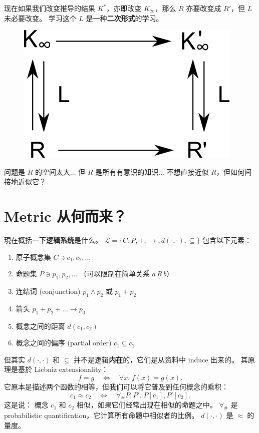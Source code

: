 \documentclass[12pt]{article}
\begin{document}
现在如果我们改变推导的结果 $K^*$，亦即改变 $K_\infty$，那么 $R$ 亦要改变成 $R'$，但 $L$ 未必要改变。  学习这个 $L$ 是一种\textbf{二次形式}的学习。
\begin{figure}[H]
\centering
\includegraphics[scale=0.6]{2nd-order-maps-3.png}
\end{figure}

问题是 $R$ 的空间太大... 但 $R$ 是所有有意识的知识... 不想直接近似 $R$，但如何间接地近似它？  

\section{Metric 从何而来？}

現在概括一下\textbf{逻辑系统}是什么。  $\mathcal{L} = \{ C, P, +, \rightarrow, d(\cdot,\cdot), \subseteq \}$ 包含以下元素：
\begin{enumerate}
\item 原子概念集 $C \ni c_1, c_2, ...$
\item 命题集 $P \ni p_1, p_2, ...$ （可以限制在简单关系 $a\, R\, b$）
\item 连结词 (conjunction) $p_1 \wedge p_2$ 或 $p_1 + p_2$
\item 箭头 $p_1 + p_2 + ... \rightarrow p_0$
\item 概念之间的距离 $d(c_1, c_2)$
\item 概念之间的偏序 (partial order) $c_1 \subseteq c_2$
\end{enumerate}

但其实 $d(\cdot, \cdot)$ 和 $\subseteq$ 并不是逻辑\textbf{内在}的，它们是从资料中 induce 出来的。 其原理是基於 Liebniz extensionality：
$$ f = g \quad \Leftrightarrow \quad \forall x. \; f(x) = g(x). $$
它原本是描述两个函数的相等，但我们可以将它普及到任何概念的乘积：
$$ c_1 \approx c_2 \quad \Leftrightarrow \quad \forall_\# P, P'. \; P[c_1], P'[c_2]. $$
这是说： 概念 $c_1$ 和 $c_2$ 相似，如果它们经常出现在相似的命题之中。  $\forall_\#$ 是 probabilistic quantification，它计算所有命题中相似者的比例。  $d(\cdot, \cdot)$ 是 $\approx$ 的量度。
\end{document}
